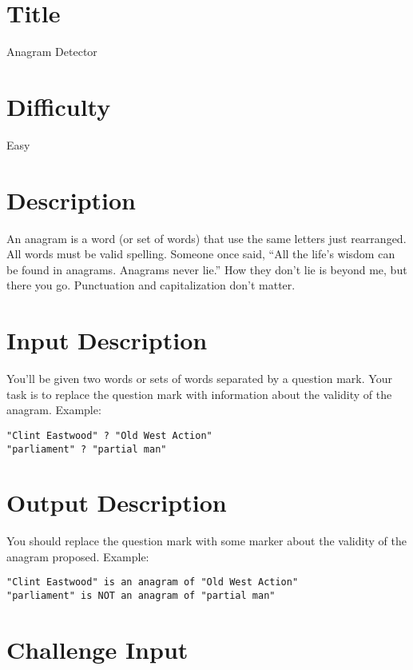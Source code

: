 \documentclass{article}
\begin{document}
\section{Title}\label{title}

Anagram Detector

\section{Difficulty}\label{difficulty}

Easy

\section{Description}\label{description}

An anagram is a word (or set of words) that use the same letters just
rearranged. All words must be valid spelling. Someone once said, ``All
the life's wisdom can be found in anagrams. Anagrams never lie.'' How
they don't lie is beyond me, but there you go. Punctuation and
capitalization don't matter.

\section{Input Description}\label{input-description}

You'll be given two words or sets of words separated by a question mark.
Your task is to replace the question mark with information about the
validity of the anagram. Example:

\begin{verbatim}
"Clint Eastwood" ? "Old West Action"
"parliament" ? "partial man"
\end{verbatim}

\section{Output Description}\label{output-description}

You should replace the question mark with some marker about the validity
of the anagram proposed. Example:

\begin{verbatim}
"Clint Eastwood" is an anagram of "Old West Action"
"parliament" is NOT an anagram of "partial man"
\end{verbatim}

\section{Challenge Input}\label{challenge-input}
\end{document}
